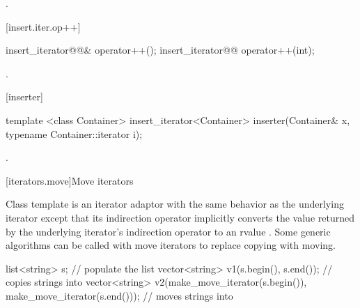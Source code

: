 \begin{itemdescr}
\pnum
\returns
{}.
\end{itemdescr}

[insert.iter.op++]{}

%
\begin{itemdecl}
insert_iterator@@& operator++();
insert_iterator@@ operator++(int);
\end{itemdecl}

\begin{itemdescr}
\pnum
\returns
{}.
\end{itemdescr}

[inserter]{}

%
\begin{itemdecl}
template <class Container>
  insert_iterator<Container> inserter(Container& x, typename Container::iterator i);
\end{itemdecl}

\begin{itemdescr}
\pnum
\returns
{}.
\end{itemdescr}

[iterators.move]{Move iterators}

\pnum
Class template  is an iterator adaptor
with the same behavior as the underlying iterator except that its
indirection operator implicitly converts the value returned by the
underlying iterator's indirection operator to an rvalue 
.
Some generic algorithms can be called with move iterators to replace
copying with moving.

\pnum
\enterexample

\begin{codeblock}
list<string> s;
// populate the list 
vector<string> v1(s.begin(), s.end());          // copies strings into 
vector<string> v2(make_move_iterator(s.begin()),
                  make_move_iterator(s.end())); // moves strings into 
\end{codeblock}

\exitexample

